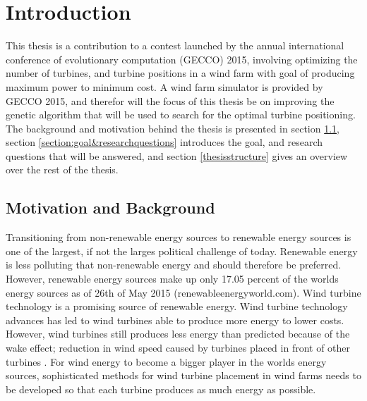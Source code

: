 \chapter{Introduction}
This thesis is a contribution to a contest launched by the annual international conference of evolutionary computation (GECCO) 2015, involving optimizing the number of turbines, and turbine positions in a wind farm with goal of producing maximum power to minimum cost. A wind farm simulator is provided by GECCO 2015, and therefor will the focus of this thesis be on improving the genetic algorithm that will be used to search for the optimal turbine positioning. The background and motivation behind the thesis is presented in section \ref{section:motivation&background}, section \ref{section:goal&researchquestions} introduces the goal, and research questions that will be answered, and section \ref{thesisstructure} gives an overview over the rest of the thesis. 


\section{Motivation and Background}\label{section:motivation&background}
Transitioning from non-renewable energy sources to renewable energy sources is one of the largest, if not the larges political challenge of today. Renewable energy is less polluting that non-renewable energy and should therefore be preferred. However, renewable energy sources make up only 17.05 percent of the worlds energy sources as of 26th of May 2015 (renewableenergyworld.com). Wind turbine technology is a promising source of renewable energy. Wind turbine technology advances has led to wind turbines able to produce more energy to lower costs. However, wind turbines still produces less energy than predicted because of the wake effect; reduction in wind speed caused by turbines placed in front of other turbines \citep{Samorani}. For wind energy to become a bigger player in the worlds energy sources, sophisticated methods for wind turbine placement in wind farms needs to be developed so that each turbine produces as much energy as possible. \\

